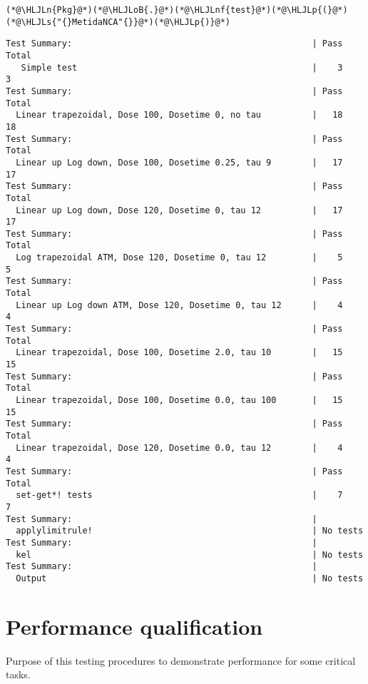 \documentclass[12pt,a4paper]{article}
\newcommand{\HLJLn}[1]{#1}
\newcommand{\HLJLnf}[1]{\textcolor[RGB]{66,102,213}{#1}}
\newcommand{\HLJLs}[1]{\textcolor[RGB]{201,61,57}{#1}}
\newcommand{\HLJLoB}[1]{\textcolor[RGB]{102,102,102}{\textbf{#1}}}
\newcommand{\HLJLp}[1]{#1}
\begin{document}
\begin{lstlisting}
(*@\HLJLn{Pkg}@*)(*@\HLJLoB{.}@*)(*@\HLJLnf{test}@*)(*@\HLJLp{(}@*)(*@\HLJLs{"{}MetidaNCA"{}}@*)(*@\HLJLp{)}@*)
\end{lstlisting}

\begin{lstlisting}
Test Summary:                                               | Pass  Total
   Simple test                                              |    3      3
Test Summary:                                               | Pass  Total
  Linear trapezoidal, Dose 100, Dosetime 0, no tau          |   18     18
Test Summary:                                               | Pass  Total
  Linear up Log down, Dose 100, Dosetime 0.25, tau 9        |   17     17
Test Summary:                                               | Pass  Total
  Linear up Log down, Dose 120, Dosetime 0, tau 12          |   17     17
Test Summary:                                               | Pass  Total
  Log trapezoidal ATM, Dose 120, Dosetime 0, tau 12         |    5      5
Test Summary:                                               | Pass  Total
  Linear up Log down ATM, Dose 120, Dosetime 0, tau 12      |    4      4
Test Summary:                                               | Pass  Total
  Linear trapezoidal, Dose 100, Dosetime 2.0, tau 10        |   15     15
Test Summary:                                               | Pass  Total
  Linear trapezoidal, Dose 100, Dosetime 0.0, tau 100       |   15     15
Test Summary:                                               | Pass  Total
  Linear trapezoidal, Dose 120, Dosetime 0.0, tau 12        |    4      4
Test Summary:                                               | Pass  Total
  set-get*! tests                                           |    7      7
Test Summary:                                               |
  applylimitrule!                                           | No tests
Test Summary:                                               |
  kel                                                       | No tests
Test Summary:                                               |
  Output                                                    | No tests
\end{lstlisting}


\section{Performance qualification}
Purpose of this testing procedures to demonstrate performance for some critical tasks.
\end{document}
